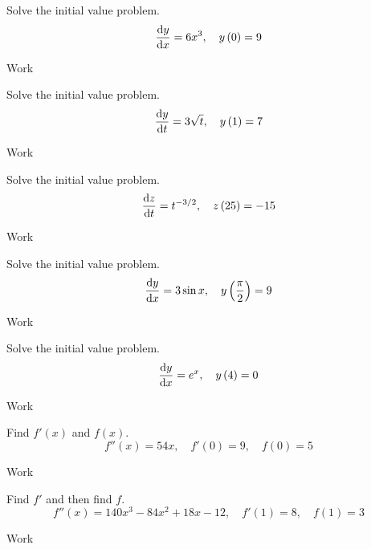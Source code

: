 \documentclass[12pt,addpoints, answers, fleqn]{exam}
\begin{document}
\begin{teacher}
\begin{questions}
Solve the initial value problem.
\[
\frac{{\rm{d}}y}{{\rm{d}}x} = 6x^3, \quad y \left( 0 \right) = 9
\]
\begin{solution}
Work
\end{solution}

\question 	%

Solve the initial value problem.
\[
\frac{{\rm{d}}y}{{\rm{d}}t} = 3\sqrt{t}, \quad y \left( 1 \right) = 7
\]
\begin{solution}
Work
\end{solution}


\question 	%

Solve the initial value problem.
\[
\frac{{\rm{d}}z}{{\rm{d}}t} = t^{-3/2}, \quad z \left( 25 \right) = -15
\]
\begin{solution}
Work
\end{solution}



\question 	%

Solve the initial value problem.
\[
\frac{{\rm{d}}y}{{\rm{d}}x} = 3 \sin x, \quad y \left( \frac{\pi}{2} \right) = 9
\]
\begin{solution}
Work
\end{solution}





\question 	%

Solve the initial value problem.
\[
\frac{{\rm{d}}y}{{\rm{d}}x} = e^x, \quad y \left( 4 \right) = 0
\]
\begin{solution}
Work
\end{solution}



\question 	%

Find $f'\left(x\right)$ and $f\left(x\right)$.
\[
f''\left(x\right) = 54x, \quad    f'\left(0\right) = 9,    \quad f\left(0\right) = 5
\]
\begin{solution}
Work
\end{solution}

\question 	%

Find $f'$ and then find $f$.
\[
f''\left(x\right)		 = 		140x^3 - 84x^2 + 18x - 12, \quad f'\left(1\right)		 = 		8, \quad  f\left(1\right)		 = 		3
\]
\begin{solution}
Work
\end{solution}


\end{questions}
\end{teacher}
\end{document}
